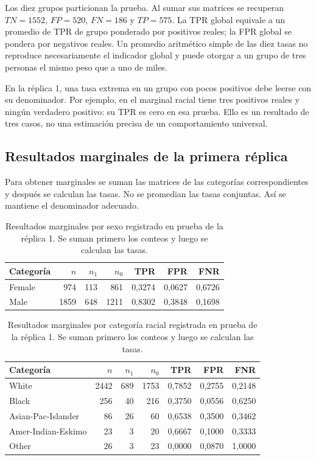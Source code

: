 \documentclass[11pt,a4paper]{article}
\newcommand{\archivo}[1]{\path{#1}}
\begin{document}
Los diez grupos particionan la prueba. Al sumar sus matrices se recuperan $TN=1552$, $FP=520$, $FN=186$ y $TP=575$. La TPR global equivale a un promedio de TPR de grupo ponderado por positivos reales; la FPR global se pondera por negativos reales. Un promedio aritmético simple de las diez tasas no reproduce necesariamente el indicador global y puede otorgar a un grupo de tres personas el mismo peso que a uno de miles.

En la réplica 1, una tasa extrema en un grupo con pocos positivos debe leerse con su denominador. Por ejemplo, \archivo{Other} en el marginal racial tiene tres positivos reales y ningún verdadero positivo: su TPR es cero en esa prueba. Ello es un resultado de tres casos, no una estimación precisa de un comportamiento universal.

\subsection{Resultados marginales de la primera réplica}
Para obtener marginales se suman las matrices de las categorías correspondientes y después se calculan las tasas. No se promedian las tasas conjuntas. Así se mantiene el denominador adecuado.

\begin{table}[H]
\centering
\caption[Resultados marginales por sexo registrado en prueba de la réplica 1.]{Resultados marginales por sexo registrado en prueba de la réplica 1. Se suman primero los conteos y luego se calculan las tasas.}\label{tab:sexo}
\small
\setlength{\tabcolsep}{4pt}
\begin{tabular}{lrrrrrr}
\toprule
Categoría & $n$ & $n_1$ & $n_0$ & TPR & FPR & FNR \\
\midrule
Female & 974 & 113 & 861 & 0,3274 & 0,0627 & 0,6726 \\
Male & 1859 & 648 & 1211 & 0,8302 & 0,3848 & 0,1698 \\
\bottomrule
\end{tabular}
\end{table}
\begin{table}[H]
\centering
\caption[Resultados marginales por categoría racial registrada en prueba de la réplica 1.]{Resultados marginales por categoría racial registrada en prueba de la réplica 1. Se suman primero los conteos y luego se calculan las tasas.}\label{tab:raza}
\small
\setlength{\tabcolsep}{4pt}
\begin{tabular}{lrrrrrr}
\toprule
Categoría & $n$ & $n_1$ & $n_0$ & TPR & FPR & FNR \\
\midrule
White & 2442 & 689 & 1753 & 0,7852 & 0,2755 & 0,2148 \\
Black & 256 & 40 & 216 & 0,3750 & 0,0556 & 0,6250 \\
Asian-Pac-Islander & 86 & 26 & 60 & 0,6538 & 0,3500 & 0,3462 \\
Amer-Indian-Eskimo & 23 & 3 & 20 & 0,6667 & 0,1000 & 0,3333 \\
Other & 26 & 3 & 23 & 0,0000 & 0,0870 & 1,0000 \\
\bottomrule
\end{tabular}
\end{table}
\end{document}
